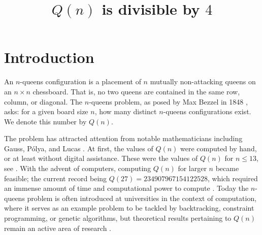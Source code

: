 \documentclass[pdflatex,sn-mathphys-num]{sn-jnl}
\theoremstyle{thmstyleone}
\theoremstyle{thmstyletwo}
\theoremstyle{thmstylethree}
\begin{document}
\title[$Q(n)$ is divisible by $4$]{$Q(n)$ is divisible by $4$}

\author*[1]{ }





\maketitle

\section{Introduction}\label{introduction}
An $n$-queens configuration is a placement of $n$ mutually non-attacking queens on an $n \times n$ chessboard. That is, no 
two queens are contained in the same row, column, or diagonal. The $n$-queens problem, as posed by Max Bezzel in 
1848 \cite{garcia2023nqueens}, asks: for a given board size $n$, how many distinct $n$-queens configurations exist. We 
denote this number by $Q(n)$. 

The problem has attracted attention from notable mathematicians including Gauss, P\'olya, and Lucas 
\cite{Pratt2019NQueens}. At first, the values of $Q(n)$ were computed by hand, or at least without digital assistance. 
These were the values of $Q(n)$ for $n \leq 13$, see \cite{BellStevens2009}. 
With the advent of computers, computing $Q(n)$ for larger $n$ became feasible; 
the current record being $Q(27) = 234907967154122528$, which required an immense amount of time and computational power to 
compute \cite{preusser_q27_2016}. 
Today the $n$-queens problem is often introduced at universities in the context of computation, where it 
serves as an example problem to be tackled by backtracking, constraint programming, or genetic algorithms, 
but theoretical results pertaining to $Q(n)$ remain an active area of research \cite{Simkin2023NQueens,Glock2022NQueens}.
\end{document}
